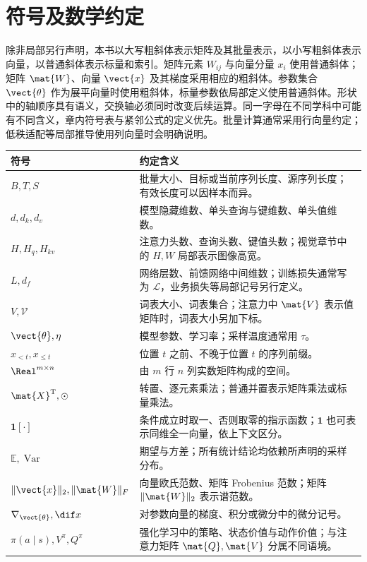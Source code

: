 \chapter*{符号及数学约定}

除非局部另行声明，本书以大写粗斜体表示矩阵及其批量表示，以小写粗斜体表示向量，以普通斜体表示标量和索引。矩阵元素 $W_{ij}$ 与向量分量 $x_i$ 使用普通斜体；矩阵 $\mat{W}$、向量 $\vect{x}$ 及其梯度采用相应的粗斜体。参数集合 $\vect{\theta}$ 作为展平向量时使用粗斜体，标量参数依局部定义使用普通斜体。形状中的轴顺序具有语义，交换轴必须同时改变后续运算。同一字母在不同学科中可能有不同含义，章内符号表与紧邻公式的定义优先。批量计算通常采用行向量约定；低秩适配等局部推导使用列向量时会明确说明。

\begin{longtable}{p{.18\linewidth}p{.73\linewidth}}
\toprule 符号 & 约定含义\\\midrule\endhead
$B,T,S$ & 批量大小、目标或当前序列长度、源序列长度；有效长度可以因样本而异。\\
$d,d_k,d_v$ & 模型隐藏维数、单头查询与键维数、单头值维数。\\
$H,H_q,H_{kv}$ & 注意力头数、查询头数、键值头数；视觉章节中的 $H,W$ 局部表示图像高宽。\\
$L,d_f$ & 网络层数、前馈网络中间维数；训练损失通常写为 $\mathcal L$，业务损失等局部记号另行定义。\\
$V,\mathcal V$ & 词表大小、词表集合；注意力中 $\mat{V}$ 表示值矩阵时，词表大小另加下标。\\
$\vect{\theta},\eta$ & 模型参数、学习率；采样温度通常用 $\tau$。\\
$x_{<t},x_{\le t}$ & 位置 $t$ 之前、不晚于位置 $t$ 的序列前缀。\\
$\Real^{m\times n}$ & 由 $m$ 行 $n$ 列实数矩阵构成的空间。\\
$\mat{X}^{\mathrm{T}},\odot$ & 转置、逐元素乘法；普通并置表示矩阵乘法或标量乘法。\\
$\mathbf1[\cdot]$ & 条件成立时取一、否则取零的指示函数；$\mathbf1$ 也可表示同维全一向量，依上下文区分。\\
$\mathbb E,\operatorname{Var}$ & 期望与方差；所有统计结论均依赖所声明的采样分布。\\
$\|\vect{x}\|_2,\|\mat{W}\|_F$ & 向量欧氏范数、矩阵 Frobenius 范数；矩阵 $\|\mat{W}\|_2$ 表示谱范数。\\
$\nabla_{\vect{\theta}},\dif x$ & 对参数向量的梯度、积分或微分中的微分记号。\\
$\pi(a\mid s),V^\pi,Q^\pi$ & 强化学习中的策略、状态价值与动作价值；与注意力矩阵 $\mat{Q},\mat{V}$ 分属不同语境。\\

\end{longtable}
